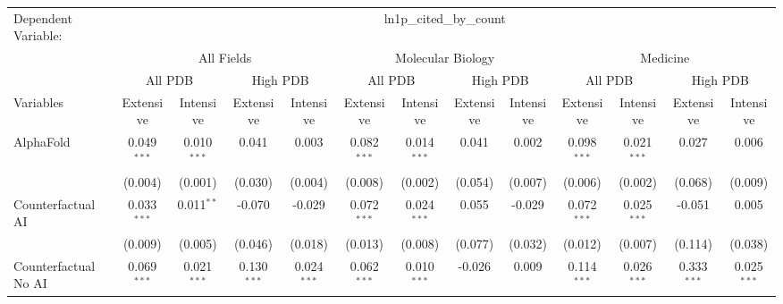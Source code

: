 \begingroup
\centering
\begin{tabular}{lcccccccccccc}
   \tabularnewline \midrule \midrule
   Dependent Variable: & \multicolumn{12}{c}{ln1p\_cited\_by\_count}\\
 & \multicolumn{4}{c}{All Fields} & \multicolumn{4}{c}{Molecular Biology} & \multicolumn{4}{c}{Medicine} \\
\cmidrule(lr){2-5} \cmidrule(lr){6-9} \cmidrule(lr){10-13}
 & \multicolumn{2}{c}{All PDB} & \multicolumn{2}{c}{High PDB} & \multicolumn{2}{c}{All PDB} & \multicolumn{2}{c}{High PDB} & \multicolumn{2}{c}{All PDB} & \multicolumn{2}{c}{High PDB} \\
\cmidrule(lr){2-3} \cmidrule(lr){4-5} \cmidrule(lr){6-7} \cmidrule(lr){8-9} \cmidrule(lr){10-11} \cmidrule(lr){12-13}
Variables & \multicolumn{1}{c}{Extensive} & \multicolumn{1}{c}{Intensive} & \multicolumn{1}{c}{Extensive} & \multicolumn{1}{c}{Intensive} & \multicolumn{1}{c}{Extensive} & \multicolumn{1}{c}{Intensive} & \multicolumn{1}{c}{Extensive} & \multicolumn{1}{c}{Intensive} & \multicolumn{1}{c}{Extensive} & \multicolumn{1}{c}{Intensive} & \multicolumn{1}{c}{Extensive} & \multicolumn{1}{c}{Intensive} \\
\cmidrule(lr){1-1}\cmidrule(lr){2-2} \cmidrule(lr){3-3} \cmidrule(lr){4-4} \cmidrule(lr){5-5} \cmidrule(lr){6-6} \cmidrule(lr){7-7} \cmidrule(lr){8-8} \cmidrule(lr){9-9} \cmidrule(lr){10-10} \cmidrule(lr){11-11} \cmidrule(lr){12-12} \cmidrule(lr){13-13}
   AlphaFold                                & 0.049$^{***}$ & 0.010$^{***}$   & 0.041         & 0.003          & 0.082$^{***}$ & 0.014$^{***}$   & 0.041   & 0.002    & 0.098$^{***}$ & 0.021$^{***}$   & 0.027         & 0.006\\   
                                            & (0.004)       & (0.001)         & (0.030)       & (0.004)        & (0.008)       & (0.002)         & (0.054) & (0.007)  & (0.006)       & (0.002)         & (0.068)       & (0.009)\\   
   Counterfactual AI                        & 0.033$^{***}$ & 0.011$^{**}$    & -0.070        & -0.029         & 0.072$^{***}$ & 0.024$^{***}$   & 0.055   & -0.029   & 0.072$^{***}$ & 0.025$^{***}$   & -0.051        & 0.005\\   
                                            & (0.009)       & (0.005)         & (0.046)       & (0.018)        & (0.013)       & (0.008)         & (0.077) & (0.032)  & (0.012)       & (0.007)         & (0.114)       & (0.038)\\   
   Counterfactual No AI                     & 0.069$^{***}$ & 0.021$^{***}$   & 0.130$^{***}$ & 0.024$^{***}$  & 0.062$^{***}$ & 0.010$^{***}$   & -0.026  & 0.009    & 0.114$^{***}$ & 0.026$^{***}$   & 0.333$^{***}$ & 0.025$^{***}$\\   

\end{tabular}
